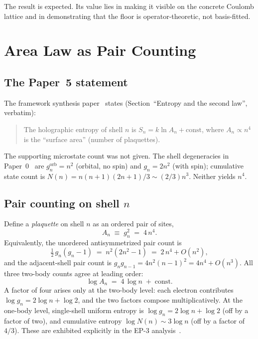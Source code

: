 \documentclass[twocolumn,pra,amsmath,amssymb,superscriptaddress]{revtex4-2}
\begin{document}
The result is expected.  Its value lies in making it visible on
the concrete Coulomb lattice and in demonstrating that the
floor is operator-theoretic, not basis-fitted.

\section{Area Law as Pair Counting}
\label{sec:area}

\subsection{The Paper~5 statement}

The framework synthesis paper~\cite{GeoVac_Paper5} states
(Section~``Entropy and the second law'', verbatim):
\begin{quote}
The holographic entropy of shell $n$ is
$S_n = k\ln A_n + \mathrm{const}$, where $A_n \propto n^{4}$
is the ``surface area'' (number of plaquettes).
\end{quote}
The supporting microstate count was not given.  The shell
degeneracies in Paper~0~\cite{GeoVac_Paper0} are $g_n^{\mathrm{orb}}=n^2$
(orbital, no spin) and $g_n=2n^{2}$ (with spin); cumulative state
count is $N(n)=n(n+1)(2n+1)/3 \sim (2/3)n^{3}$.  Neither yields
$n^{4}$.

\subsection{Pair counting on shell $n$}

Define a \emph{plaquette} on shell $n$ as an ordered pair of
sites,
\begin{equation}
  A_n \;\equiv\; g_n^{2} \;=\; 4\, n^{4}.
  \label{eq:An}
\end{equation}
Equivalently, the unordered antisymmetrized pair count is
\begin{equation}
  \tfrac{1}{2}\, g_n(g_n-1) \;=\; n^{2}(2n^{2}-1)
  \;=\; 2\,n^{4} + O(n^{2}),
\end{equation}
and the adjacent-shell pair count is
$g_n g_{n-1} = 4n^{2}(n-1)^{2} = 4n^{4} + O(n^{3})$.  All three
two-body counts agree at leading order:
\begin{equation}
  \log A_n \;=\; 4\,\log n \;+\; \mathrm{const}.
  \label{eq:logAn}
\end{equation}
A factor of four arises only at the two-body level: each
electron contributes $\log g_n = 2\log n + \log 2$, and the two
factors compose multiplicatively.  At the one-body level,
single-shell uniform entropy is $\log g_n = 2\log n + \log 2$
(off by a factor of two), and cumulative entropy
$\log N(n) \sim 3\log n$ (off by a factor of $4/3$).  These are
exhibited explicitly in the EP-3 analysis~\cite{EP3_data}.
\end{document}
